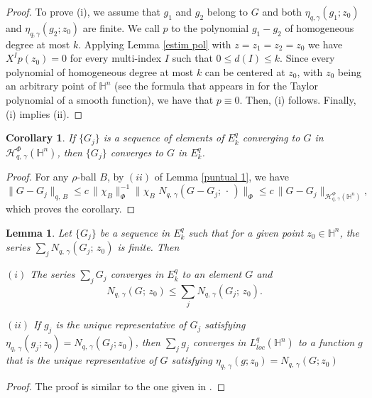 \documentclass[oneside,10pt]{article}
\newtheorem{corollary}[theorem]{Corollary}
\newtheorem{lemma}[theorem]{Lemma}
\begin{document}
\begin{proof}
To prove (i), we assume that $g_1$ and $g_2$ belong to $G$ and both $\eta_{q, \gamma}(g_1; z_0)$ and 
$\eta_{q, \gamma}(g_2; z_0)$ are finite. We call $p$ to the polynomial $g_1 - g_2$ of homogeneous degree at most $k$. Applying 
Lemma \ref{estim pol} with $z = z_1 = z_2 = z_0$ we have $X^{I}p(z_0) = 0$ for every multi-index $I$ such that $0 \leq d(I) \leq k$. Since every polynomial of homogeneous degree at most $k$ can be centered at $z_0$, with $z_0$ being an arbitrary point of 
$\mathbb{H}^n$ (see the formula that appears in \cite[Section 5.2, p. 272]{Bonfi} for the Taylor polynomial of a smooth function), we have that $p \equiv 0$. Then, (i) follows. Finally, (i) implies (ii).
\end{proof}

\begin{corollary} If $\{ G_{j} \}$ is a sequence of elements of $E^{q}_{k}$ converging to $G$ in 
$\mathcal{H}^{\Phi}_{q, \, \gamma}(\mathbb{H}^{n})$, then $\{ G_{j} \}$ converges to $G$ in $E^{q}_{k}$.
\end{corollary}

\begin{proof} For any $\rho$-ball $B$, by $(ii)$ of Lemma \ref{puntual 1}, we have
$$\| G- G_{j} \|_{q, \, B} \leq c \, \| \chi_{B} \|_{\Phi}^{-1} 
\| \chi_{B} \,\, N_{q, \, \gamma}(G - G_{j}; \, \cdot \,) \|_{\Phi} 
\leq c \, \| G - G_{j} \|_{\mathcal{H}^{\Phi}_{q, \, \gamma}(\mathbb{H}^{n})},$$
which proves the corollary.
\end{proof}

\begin{lemma} \label{series in Eqk} Let $\{ G_{j} \}$ be a sequence in $E^{q}_{k}$ such that for a given point $z_0 \in \mathbb{H}^n$, the series 
$\sum_j N_{q, \, \gamma}(G_{j}; \, z_0 )$ is finite. Then

\qquad

$(i)$ The series $\sum_j G_j$ converges in $E_{k}^{q}$ to an element $G$ and 
$$N_{q, \, \gamma}(G; \, z_0 ) \leq \sum_j N_{q, \, \gamma}(G_{j}; \, z_0 ).$$

$(ii)$ If $g_j$ is the unique representative of $G_j$ satisfying
$\eta_{q, \, \gamma} (g_j; z_0) = N_{q, \, \gamma}(G_j; z_0)$, then $\sum_j g_j$ converges in $L^{q}_{loc}(\mathbb{H}^{n})$ to a function 
$g$ that is the unique representative of $G$ satisfying $\eta_{q, \, \gamma} (g; z_0) = N_{q, \, \gamma}(G; z_0)$
\end{lemma}

\begin{proof} The proof is similar to the one given in \cite[Lemma 4]{segovia}.
\end{proof}
\end{document}
